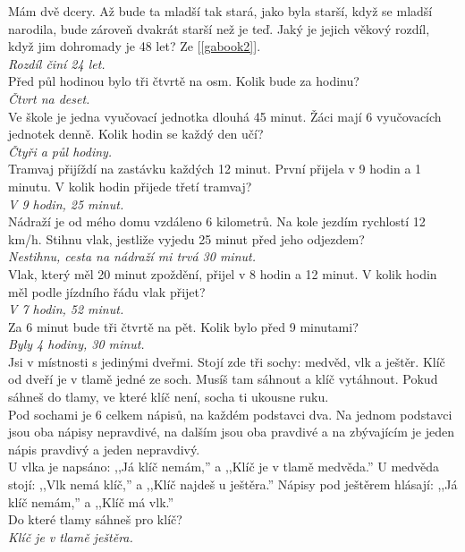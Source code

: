 \begin{multicols}{2}
\noindent
Mám dvě dcery. Až bude ta mladší tak stará, jako byla starší, když se mladší
narodila, bude zároveň dvakrát starší než je teď. Jaký je jejich věkový
rozdíl, když jim dohromady je 48 let? Ze [\ref{gabook2}].\\[1 mm]
{\sl Rozdíl činí 24 let.}\\

\noindent
Před půl hodinou bylo tři čtvrtě na osm. Kolik bude za hodinu?\\[1 mm]
{\sl Čtvrt na deset.}\\

\noindent
Ve škole je jedna vyučovací jednotka dlouhá 45 minut. Žáci mají 6 vyučovacích
jednotek denně. Kolik hodin se každý den učí?\\[1 mm]
{\sl Čtyři a půl hodiny.}\\

\noindent
Tramvaj přijíždí na zastávku každých 12 minut. První přijela v 9 hodin a 1
minutu. V kolik hodin přijede třetí tramvaj?\\[1 mm]
{\sl V 9 hodin, 25 minut.}\\

\noindent
Nádraží je od mého domu vzdáleno 6 kilometrů. Na kole jezdím rychlostí
12 km/h. Stihnu vlak, jestliže vyjedu 25 minut před jeho odjezdem?\\[1 mm]
{\sl Nestihnu, cesta na nádraží mi trvá 30 minut.}\\

\noindent
Vlak, který měl 20 minut zpoždění, přijel v 8 hodin a 12 minut. V kolik
hodin měl podle jízdního řádu vlak přijet?\\[1 mm]
{\sl V 7 hodin, 52 minut.}\\

\noindent
Za 6 minut bude tři čtvrtě na pět. Kolik bylo před 9 minutami?\\[1 mm]
{\sl Byly 4 hodiny, 30 minut.}\\

\noindent
Jsi v místnosti s jedinými dveřmi. Stojí zde tři sochy: medvěd, vlk
a ještěr. Klíč od dveří je v tlamě jedné ze soch. Musíš tam sáhnout a
klíč vytáhnout. Pokud sáhneš do tlamy, ve které klíč není, socha ti
ukousne ruku.\\
Pod sochami je 6 celkem nápisů, na každém podstavci dva. Na jednom
podstavci jsou oba nápisy nepravdivé, na dalším jsou oba pravdivé a na
zbývajícím je jeden nápis pravdivý a jeden nepravdivý.\\
U vlka je napsáno: ,,Já klíč nemám,'' a ,,Klíč je v tlamě medvěda.'' U
medvěda stojí: ,,Vlk nemá klíč,'' a ,,Klíč najdeš u ještěra.'' Nápisy pod
ještěrem hlásají: ,,Já klíč nemám,'' a ,,Klíč má vlk.''\\
Do které tlamy sáhneš pro klíč?\\[1 mm]
{\sl Klíč je v tlamě ještěra.}\\


\end{multicols}
